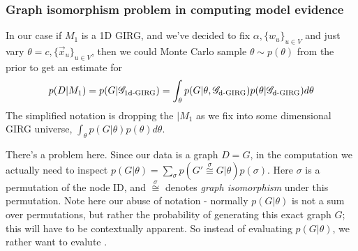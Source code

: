 \subsubsection{Graph isomorphism problem in computing model evidence}
In our case if $M_1$ is a 1D GIRG, and we've decided to fix 
$\alpha, \{w_u\}_{u \in V}$
 and just vary $\theta = c, \{\vec{x}_u\}_{u \in V}$, then we could Monte Carlo sample $\theta \sim p(\theta)$ from the prior to get an estimate for
\begin{equation} \label{eq:incorrect_girg_model_likelihood}
  p(D| M_1) = p(G | \mathscr{G}_{\text{1d-}\mathrm{GIRG}}) = \int_\theta p(G | \theta, \mathscr{G}_{\text{d-}\mathrm{GIRG}}) p(\theta | \mathscr{G}_{\text{d-}\mathrm{GIRG}}) d\theta
\end{equation}
The simplified notation is dropping the $| M_1$ as we fix into some dimensional GIRG universe, $\int_\theta p(G | \theta) p(\theta) d\theta$.

There's a problem here. Since our data is a graph $D=G$, in the computation we actually need to inspect $p(G | \theta) = \sum_{\sigma} p(G' \stackrel{\sigma}{\cong} G | \theta) p(\sigma)$. Here $\sigma$ is a permutation of the node ID, and $\stackrel{\sigma}{\cong}$ denotes \textit{graph isomorphism} under this permutation. Note here our abuse of notation - normally $p(G | \theta)$ is not a sum over permutations, but rather the probability of generating this exact graph $G$; this will have to be contextually apparent. So instead of evaluating $p(G | \theta)$, we rather want to evalute .




